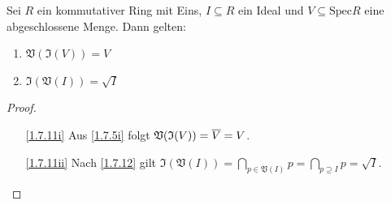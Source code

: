 \documentclass[a4paper,12pt]{scrbook}
\newtheorem{proof}{Beweis}
\def\V{\mathfrak{V}}
\def\I{\mathfrak{I}}
\newcommand{\Spec}{\mathrm{Spec}}
\def\Bar#1{\ensuremath\overline{#1}}
\begin{document}
\begin{prop}\label{1.7.11}
  Sei $R$ ein kommutativer Ring mit Eins, $I\subseteq R$ ein Ideal und $V\subseteq\Spec R$ eine abgeschlossene Menge. Dann
  gelten:
  \begin{enumerate}
  \item{} $\V(\I(V))=V$
  \item{} $\I(\V(I))=\sqrt{I}$
  \end{enumerate}
\end{prop}
\begin{proof}
  \begin{enumerate}
  \item[\ref{1.7.11i}] Aus \cref{1.7.5i} folgt $\V(\I(V))=\Bar{V}=V$.
  \item[\ref{1.7.11ii}] Nach \cref{1.7.12} gilt $\displaystyle\I(\V(I))=\bigcap_{p\in\V(I)}p=\bigcap_{p\supseteq I}p=\sqrt{I}$.
  \end{enumerate}
\end{proof}
\end{document}
